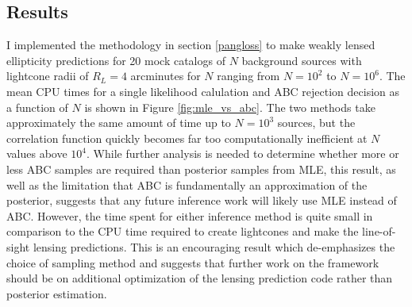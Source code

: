\documentclass[%
 reprint,
 amsmath,amssymb,
 aps,nofootinbib
]{revtex4-1}
\begin{document}
\subsection{Results} \label{inference_results}

I implemented the methodology in section \ref{pangloss} to make weakly lensed ellipticity predictions for 20 mock catalogs of $N$ background sources with lightcone radii of $R_L=4$ arcminutes for $N$ ranging from $N=10^2$ to $N=10^6$. The mean CPU times for a single likelihood calulation and ABC rejection decision as a function of $N$ is shown in Figure \ref{fig:mle_vs_abc}. The two methods take approximately the same amount of time up to $N=10^3$ sources, but the correlation function quickly becomes far too computationally inefficient at $N$ values above $10^4$. While further analysis is needed to determine whether more or less ABC samples are required than posterior samples from MLE, this result, as well as the limitation that ABC is fundamentally an approximation of the posterior, suggests that any future inference work will likely use MLE instead of ABC. However, the time spent for either inference method is quite small in comparison to the CPU time required to create lightcones and make the line-of-sight lensing predictions. This is an encouraging result which de-emphasizes the choice of sampling method and suggests that further work on the framework should be on additional optimization of the lensing prediction code rather than posterior estimation.
\end{document}
